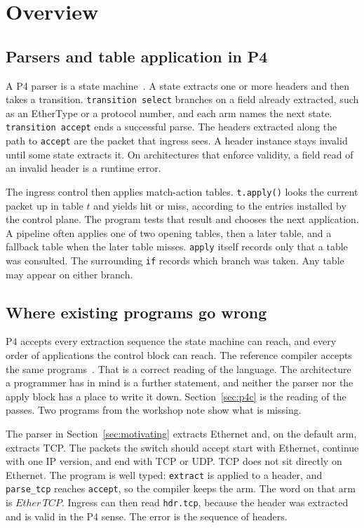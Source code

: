 \documentclass[a4paper,UKenglish,cleveref,autoref]{lipics-v2021}
\begin{document}
\section{Overview}
\label{sec:overview}

\subsection{Parsers and table application in P4}

A P4 parser is a state machine~\cite{p4langspec,bosshart2014p4}.
A state extracts one or more headers and then takes a transition.
\texttt{transition select} branches on a field already extracted, such as an EtherType or a protocol number, and each arm names the next state.
\texttt{transition accept} ends a successful parse.
The headers extracted along the path to \texttt{accept} are the packet that ingress sees.
A header instance stays invalid until some state extracts it.
On architectures that enforce validity, a field read of an invalid header is a runtime error.

The ingress control then applies match-action tables.
\texttt{t.apply()} looks the current packet up in table \(t\) and yields hit or miss, according to the entries installed by the control plane.
The program tests that result and chooses the next application.
A pipeline often applies one of two opening tables, then a later table, and a fallback table when the later table misses.
\texttt{apply} itself records only that a table was consulted.
The surrounding \texttt{if} records which branch was taken.
Any table may appear on either branch.

\subsection{Where existing programs go wrong}

P4 accepts every extraction sequence the state machine can reach, and every order of applications the control block can reach.
The reference compiler accepts the same programs~\cite{p4c}.
That is a correct reading of the language.
The architecture a programmer has in mind is a further statement, and neither the parser nor the apply block has a place to write it down.
Section~\ref{sec:p4c} is the reading of the passes.
Two programs from the workshop note show what is missing.

The parser in Section~\ref{sec:motivating} extracts Ethernet and, on the default arm, extracts TCP.
The packets the switch should accept start with Ethernet, continue with one IP version, and end with TCP or UDP.
TCP does not sit directly on Ethernet.
The program is well typed: \texttt{extract} is applied to a header, and \texttt{parse\_tcp} reaches \texttt{accept}, so the compiler keeps the arm.
The word on that arm is \(\mathit{Ether}\,\mathit{TCP}\).
Ingress can then read \texttt{hdr.tcp}, because the header was extracted and is valid in the P4 sense.
The error is the sequence of headers.
\end{document}
